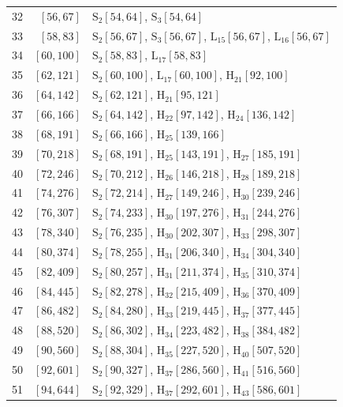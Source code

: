 \documentclass{amsart}
\theoremstyle{definition}
\theoremstyle{remark}
\numberwithin{equation}{section}
\begin{document}
{\begin{longtable}{rrp{}}
32&$[56,67]$&$\mathrm{S}_{2}[54,64]$, $\mathrm{S}_{3}[54,64]$\\
33&$[58,83]$&$\mathrm{S}_{2}[56,67]$, $\mathrm{S}_{3}[56,67]$, $\mathrm{L}_{15}[56,67]$, $\mathrm{L}_{16}[56,67]$\\
34&$[60,100]$&$\mathrm{S}_{2}[58,83]$, $\mathrm{L}_{17}[58,83]$\\
35&$[62,121]$&$\mathrm{S}_{2}[60,100]$, $\mathrm{L}_{17}[60,100]$, $\mathrm{H}_{21}[92,100]$\\
36&$[64,142]$&$\mathrm{S}_{2}[62,121]$, $\mathrm{H}_{21}[95,121]$\\
37&$[66,166]$&$\mathrm{S}_{2}[64,142]$, $\mathrm{H}_{22}[97,142]$, $\mathrm{H}_{24}[136,142]$\\
38&$[68,191]$&$\mathrm{S}_{2}[66,166]$, $\mathrm{H}_{25}[139,166]$\\
39&$[70,218]$&$\mathrm{S}_{2}[68,191]$, $\mathrm{H}_{25}[143,191]$, $\mathrm{H}_{27}[185,191]$\\
40&$[72,246]$&$\mathrm{S}_{2}[70,212]$, $\mathrm{H}_{26}[146,218]$, $\mathrm{H}_{28}[189,218]$\\
41&$[74,276]$&$\mathrm{S}_{2}[72,214]$, $\mathrm{H}_{27}[149,246]$, $\mathrm{H}_{30}[239,246]$\\
42&$[76,307]$&$\mathrm{S}_{2}[74,233]$, $\mathrm{H}_{30}[197,276]$, $\mathrm{H}_{31}[244,276]$\\
43&$[78,340]$&$\mathrm{S}_{2}[76,235]$, $\mathrm{H}_{30}[202,307]$, $\mathrm{H}_{33}[298,307]$\\
44&$[80,374]$&$\mathrm{S}_{2}[78,255]$, $\mathrm{H}_{31}[206,340]$, $\mathrm{H}_{34}[304,340]$\\
45&$[82,409]$&$\mathrm{S}_{2}[80,257]$, $\mathrm{H}_{31}[211,374]$, $\mathrm{H}_{35}[310,374]$\\
46&$[84,445]$&$\mathrm{S}_{2}[82,278]$, $\mathrm{H}_{32}[215,409]$, $\mathrm{H}_{36}[370,409]$\\
47&$[86,482]$&$\mathrm{S}_{2}[84,280]$, $\mathrm{H}_{33}[219,445]$, $\mathrm{H}_{37}[377,445]$\\
48&$[88,520]$&$\mathrm{S}_{2}[86,302]$, $\mathrm{H}_{34}[223,482]$, $\mathrm{H}_{38}[384,482]$\\
49&$[90,560]$&$\mathrm{S}_{2}[88,304]$, $\mathrm{H}_{35}[227,520]$, $\mathrm{H}_{40}[507,520]$\\
50&$[92,601]$&$\mathrm{S}_{2}[90,327]$, $\mathrm{H}_{37}[286,560]$, $\mathrm{H}_{41}[516,560]$\\
51&$[94,644]$&$\mathrm{S}_{2}[92,329]$, $\mathrm{H}_{37}[292,601]$, $\mathrm{H}_{43}[586,601]$\\

\end{longtable}}
\end{document}
